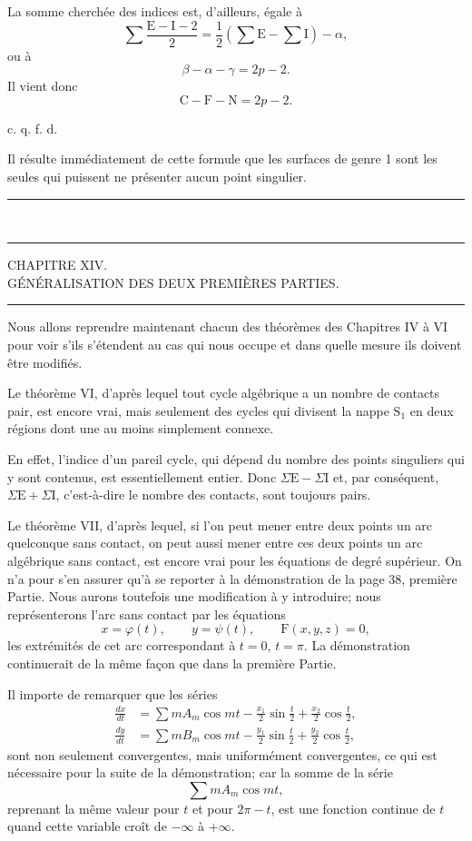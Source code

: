 \documentclass[11pt]{article}
\newcommand{\ornament}{\begin{center}\rule{2.5em}{0.4pt}\,\raisebox{0.1ex}{\tiny$\bullet\bullet\bullet$}\,\rule{2.5em}{0.4pt}\end{center}}
\newcommand{\shortline}{\begin{center}\rule{3.5em}{0.4pt}\end{center}}
\begin{document}
La somme cherchée des indices est, d’ailleurs, égale à
\[
\sum \frac{\mathrm{E}-\mathrm{I}-2}{2}
=\frac12\left(\sum\mathrm{E}-\sum\mathrm{I}\right)-\alpha,
\]
ou à
\[
\beta-\alpha-\gamma=2p-2.
\]
Il vient donc
\[
\mathrm{C}-\mathrm{F}-\mathrm{N}=2p-2.
\]
\begin{flushright}c. q. f. d.\end{flushright}

Il résulte immédiatement de cette formule que les surfaces de genre 1 sont les seules qui puissent ne présenter aucun point singulier.

\ornament

\begin{center}
{\large CHAPITRE XIV.}\\[0.4em]
{\small GÉNÉRALISATION DES DEUX PREMIÈRES PARTIES.}
\end{center}
\shortline

Nous allons reprendre maintenant chacun des théorèmes des Chapitres IV à VI pour voir s’ils s’étendent au cas qui nous occupe et dans quelle mesure ils doivent être modifiés.

Le théorème VI, d’après lequel tout cycle algébrique a un nombre de contacts pair, est encore vrai, mais seulement des cycles qui divisent la nappe $\mathrm{S}_1$ en deux régions dont une au moins simplement connexe.

En effet, l’indice d’un pareil cycle, qui dépend du nombre des points singuliers qui y sont contenus, est essentiellement entier. Donc $\Sigma\mathrm{E}-\Sigma\mathrm{I}$ et, par conséquent, $\Sigma\mathrm{E}+\Sigma\mathrm{I}$, c’est-à-dire le nombre des contacts, sont toujours pairs.

Le théorème VII, d’après lequel, si l’on peut mener entre deux points un arc quelconque sans contact, on peut aussi mener entre ces deux points un arc algébrique sans contact, est encore vrai pour les équations de degré supérieur. On n’a pour s’en assurer qu’à se reporter à la démonstration de la page 38, première Partie. Nous aurons toutefois une modification à y introduire; nous représenterons l’arc sans contact par les équations
\[
x=\varphi(t),\qquad y=\psi(t),\qquad \mathrm{F}(x,y,z)=0,
\]
les extrémités de cet arc correspondant à $t=0$, $t=\pi$. La démonstration continuerait de la même façon que dans la première Partie.

Il importe de remarquer que les séries
\[
\begin{aligned}
\frac{dx}{dt}&=\sum mA_m\cos mt-\frac{x_1}{2}\sin\frac{t}{2}+\frac{x_2}{2}\cos\frac{t}{2},\\
\frac{dy}{dt}&=\sum mB_m\cos mt-\frac{y_1}{2}\sin\frac{t}{2}+\frac{y_2}{2}\cos\frac{t}{2},
\end{aligned}
\]
sont non seulement convergentes, mais uniformément convergentes, ce qui est nécessaire pour la suite de la démonstration; car la somme de la série
\[
\sum mA_m\cos mt,
\]
reprenant la même valeur pour $t$ et pour $2\pi-t$, est une fonction continue de $t$ quand cette variable croît de $-\infty$ à $+\infty$.
\end{document}
